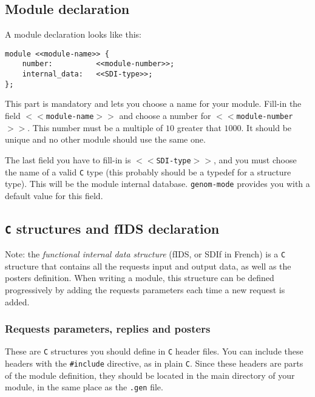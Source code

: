 \subsection{Module declaration}

A module declaration looks like this:

\begin{center}\begin{cartouche}\small\begin{verbatim}
module <<module-name>> {
    number:          <<module-number>>;
    internal_data:   <<SDI-type>>;
};
\end{verbatim}\end{cartouche}\end{center}

This part   is  mandatory  and    lets   you  choose a  name   for   your
module.  Fill-in the field  {\tt $<<$module-name$>>$} and choose a number
for {\tt  $<<$module-number$>>$}. This number must  be a multiple of $10$
greater that  $1000$. It should be unique  and no other module should use
the same one.

The last  field you have  to fill-in  is {\tt  $<<$SDI-type$>>$}, and you
must choose the name of  a valid {\tt C} type  (this probably should be a
typedef  for  a   structure type).   This  will  be  the  module internal
database. {\tt   genom-mode} provides you with  a  default value for this
field.

\subsection{{\tt C} structures and fIDS declaration}

Note:  the  {\em functional internal  data  structure} (fIDS, or  SDIf in
French) is  a {\tt C} structure that  contains all the requests input and
output data,  as well as the  posters definition.  When writing a module,
this structure   can  be defined  progressively  by   adding the requests
parameters each time a new request is added.

\subsubsection{Requests parameters, replies and posters}

These are {\tt  C} structures you should define  in {\tt C} header files.
You can include  these headers with the {\tt  \#include} directive, as in
plain {\tt C}.  Since these headers are parts  of the  module definition,
they should be located in the main directory  of your module, in the same
place as the {\tt .gen} file.

